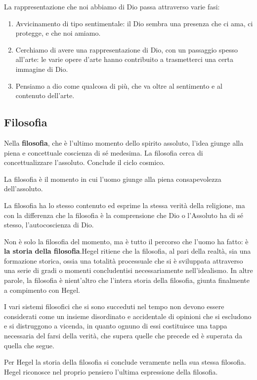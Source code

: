 \documentclass[a4paper, twoside, titlepage]{book}
\begin{document}
La rappresentazione che noi abbiamo di Dio passa attraverso varie fasi:
\begin{enumerate}
\item Avvicinamento di tipo sentimentale: il Dio sembra una presenza che ci ama, ci protegge, e che noi amiamo.
\item Cerchiamo di avere una rappresentazione di Dio, con un passaggio spesso all’arte: le varie opere d’arte hanno contribuito a trasmetterci una certa immagine di Dio.
\item Pensiamo a dio come qualcosa di più, che va oltre al sentimento e al contenuto dell’arte.
\end{enumerate}

\subsection{Filosofia}

Nella \textbf{filosofia}, che è l'ultimo momento dello spirito assoluto, l'idea giunge alla piena e concettuale coscienza di sé medesima. La filosofia cerca di concettualizzare l’assoluto. Conclude il ciclo cosmico.

La filosofia è il momento in cui l’uomo giunge alla piena consapevolezza dell’assoluto.

La filosofia ha lo stesso contenuto ed esprime la stessa verità della religione, ma con la differenza che la filosofia è la comprensione che Dio o l'Assoluto ha di sé stesso, l'autocoscienza di Dio.

Non è solo la filosofia del momento, ma è tutto il percorso che l’uomo ha fatto: è \textbf{la storia della filosofia}.Hegel ritiene che la filosofia, al pari della realtà, sia una formazione storica, ossia una totalità processuale che si è sviluppata attraverso una serie di gradi o momenti concludentisi necessariamente nell'idealismo.
In altre parole, la filosofia è nient'altro che l'intera storia della filosofia, giunta finalmente a compimento con Hegel.

I vari sistemi filosofici che si sono succeduti nel tempo non devono essere considerati come un insieme disordinato e accidentale di opinioni che si escludono e si distruggono a vicenda, in quanto ognuno di essi costituisce una tappa necessaria del farsi della verità, che supera quelle che precede ed è superata da quella che segue.

Per Hegel la storia della filosofia si conclude veramente nella sua stessa filosofia. Hegel riconosce nel proprio pensiero l'ultima espressione della filosofia.
\end{document}
